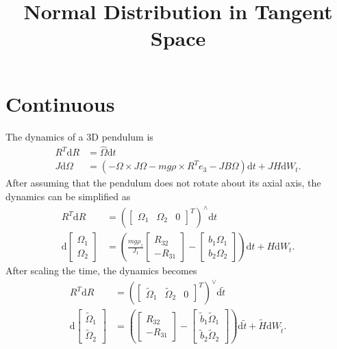 \documentclass[10pt]{article}
\title{Normal Distribution in Tangent Space}
\date{}
\newcommand{\diff}[1]{\mathrm{d}#1}
\begin{document}
	
\maketitle

\section{Continuous}

The dynamics of a 3D pendulum is
\begin{align*}
	R^T\diff{R} &= \hat{\Omega}\diff{t} \\
	J\diff{\Omega} &= \left( -\Omega\times J\Omega - mg\rho\times R^Te_3 - JB\Omega \right) \diff{t} + JH\diff{W}_t.
\end{align*}
After assuming that the pendulum does not rotate about its axial axis, the dynamics can be simplified as
\begin{align*}
	R^T\diff{R} &= \left( \begin{bmatrix} \Omega_1 & \Omega_2 & 0 \end{bmatrix}^T \right)^\wedge \diff{t} \\
	\diff{\begin{bmatrix} \Omega_1 \\ \Omega_2 \end{bmatrix}} &= \left( \frac{mg\rho_z}{J_1} \begin{bmatrix} R_{32} \\ -R_{31} \end{bmatrix} - \begin{bmatrix} b_1\Omega_1 \\ b_2\Omega_2 \end{bmatrix} \right) \diff{t} + H\diff{W}_t.
\end{align*}
After scaling the time, the dynamics becomes
\begin{align*}
	R^T\diff{R} &= \left( \begin{bmatrix} \tilde{\Omega}_1 & \tilde{\Omega}_2 & 0 \end{bmatrix}^T \right)^\vee \diff{\tilde{t}} \\
	\diff{\begin{bmatrix} \tilde{\Omega}_1 \\ \tilde{\Omega}_2 \end{bmatrix}} &= \left( \begin{bmatrix} R_{32} \\ -R_{31} \end{bmatrix} - \begin{bmatrix} \tilde{b}_1\tilde{\Omega}_1 \\ \tilde{b}_2\tilde{\Omega}_2 \end{bmatrix} \right) \diff{\tilde{t}} + \tilde{H}\diff{W_{\tilde{t}}}.
\end{align*}
\end{document}

